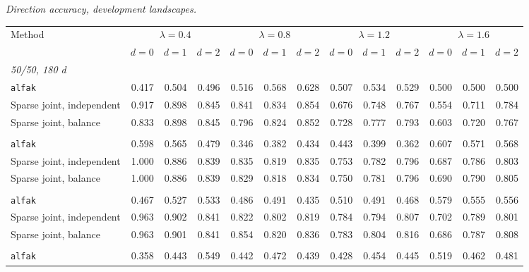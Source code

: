 \noindent\textit{Direction accuracy, development landscapes.}
\begin{center}
\scriptsize
\setlength{\tabcolsep}{2.5pt}
\begin{tabular}{l*{12}{r}}
\toprule
Method & \multicolumn{3}{c}{$\lambda=0.4$} & \multicolumn{3}{c}{$\lambda=0.8$} & \multicolumn{3}{c}{$\lambda=1.2$} & \multicolumn{3}{c}{$\lambda=1.6$} \\
\cmidrule(lr){2-4}\cmidrule(lr){5-7}\cmidrule(lr){8-10}\cmidrule(lr){11-13}
 & $d=0$ & $d=1$ & $d=2$ & $d=0$ & $d=1$ & $d=2$ & $d=0$ & $d=1$ & $d=2$ & $d=0$ & $d=1$ & $d=2$ \\
\midrule
\multicolumn{13}{l}{\textit{50/50, 180 d}} \\
\quad \texttt{alfak} & 0.417 & 0.504 & 0.496 & 0.516 & 0.568 & 0.628 & 0.507 & 0.534 & 0.529 & 0.500 & 0.500 & 0.500 \\
\quad Sparse joint, independent & 0.917 & 0.898 & 0.845 & 0.841 & 0.834 & 0.854 & 0.676 & 0.748 & 0.767 & 0.554 & 0.711 & 0.784 \\
\quad Sparse joint, balance & 0.833 & 0.898 & 0.845 & 0.796 & 0.824 & 0.852 & 0.728 & 0.777 & 0.793 & 0.603 & 0.720 & 0.767 \\
\addlinespace[2pt]
\multicolumn{13}{l}{\textit{200/200, 180 d}} \\
\quad \texttt{alfak} & 0.598 & 0.565 & 0.479 & 0.346 & 0.382 & 0.434 & 0.443 & 0.399 & 0.362 & 0.607 & 0.571 & 0.568 \\
\quad Sparse joint, independent & 1.000 & 0.886 & 0.839 & 0.835 & 0.819 & 0.835 & 0.753 & 0.782 & 0.796 & 0.687 & 0.786 & 0.803 \\
\quad Sparse joint, balance & 1.000 & 0.886 & 0.839 & 0.829 & 0.818 & 0.834 & 0.750 & 0.781 & 0.796 & 0.690 & 0.790 & 0.805 \\
\addlinespace[2pt]
\multicolumn{13}{l}{\textit{200/200, 360 d}} \\
\quad \texttt{alfak} & 0.467 & 0.527 & 0.533 & 0.486 & 0.491 & 0.435 & 0.510 & 0.491 & 0.468 & 0.579 & 0.555 & 0.556 \\
\quad Sparse joint, independent & 0.963 & 0.902 & 0.841 & 0.822 & 0.802 & 0.819 & 0.784 & 0.794 & 0.807 & 0.702 & 0.789 & 0.801 \\
\quad Sparse joint, balance & 0.963 & 0.901 & 0.841 & 0.854 & 0.820 & 0.836 & 0.783 & 0.804 & 0.816 & 0.686 & 0.787 & 0.808 \\
\addlinespace[2pt]
\multicolumn{13}{l}{\textit{500/700, 360 d}} \\
\quad \texttt{alfak} & 0.358 & 0.443 & 0.549 & 0.442 & 0.472 & 0.439 & 0.428 & 0.454 & 0.445 & 0.519 & 0.462 & 0.481 \\

\end{tabular}
\end{center}

